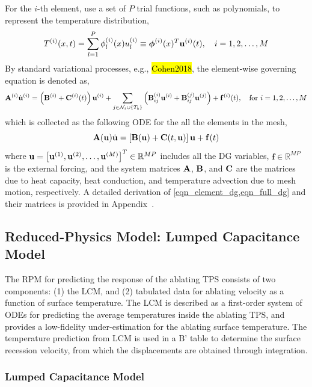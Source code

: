 For the $i$-th element, use a set of $P$ trial functions, such as polynomials, to represent the temperature distribution,
\begin{equation}
    T^{(i)}(x,t) = \sum_{l=1}^{P} \phi_l^{(i)}(x)u_l^{(i)} \equiv \boldsymbol{\phi}^{(i)}(x)^T\mathbf{u}^{(i)}(t),\quad i=1,2,\dots,M\label{eqn_element_temperature}
\end{equation}
By standard variational processes, e.g., \hl{Cohen2018}, the element-wise governing equation is denoted as,
\begin{equation}
    \mathbf{A}^{(i)}\dot{\mathbf{u}}^{(i)} = \left(\mathbf{B}^{(i)} + \mathbf{C}^{(i)}(t)\right)\mathbf{u}^{(i)} + \sum_{j\in\mathcal{N}_i\cup\left\{T_b\right\}}\left(\mathbf{B}^{(i)}_{ij}\mathbf{u}^{(i)} + \mathbf{B}^{(j)}_{ij}\mathbf{u}^{(j)}\right) + \mathbf{f}^{(i)}(t),\quad\text{for }i=1,2,\dots,M\label{eqn_element_dg}
\end{equation}
which is collected as the following ODE for the all the elements in the mesh,
\begin{equation}
    \mathbf{A}(\mathbf{u})\dot{\mathbf{u}} = \left[\mathbf{B}(\mathbf{u}) + \mathbf{C}(t,\mathbf{u})\right]\mathbf{u} + \mathbf{f}(t)\label{eqn_full_dg}
\end{equation}
where $\mathbf{u} = \left[\mathbf{u}^{(1)}, \mathbf{u}^{(2)}, \ldots, \mathbf{u}^{(M)}\right]^T\in\mathbb{R}^{MP}$ includes all the DG variables, $\mathbf{f}\in\mathbb{R}^{MP}$ is the external forcing, and the system matrices $\mathbf{A}$, $\mathbf{B}$, and $\mathbf{C}$ are the matrices due to heat capacity, heat conduction, and temperature advection due to mesh motion, respectively. A detailed derivation of \cref{eqn_element_dg,eqn_full_dg} and their matrices is provided in Appendix~\cite{appendix_derivations}.

\subsection{Reduced-Physics Model: Lumped Capacitance Model}

The RPM for predicting the response of the ablating TPS consists of two components: (1) the LCM, and (2) tabulated data for ablating velocity as a function of surface temperature. The LCM is described as a first-order system of ODEs for predicting the average temperatures inside the ablating TPS, and provides a low-fidelity under-estimation for the ablating surface temperature. The temperature prediction from LCM is used in a B' table to determine the surface recession velocity, from which the displacements are obtained through integration.

\subsubsection{Lumped Capacitance Model}

